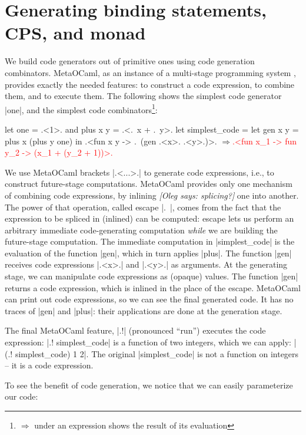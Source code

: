 \documentclass[draft]{elsart}
\newcommand{\evalresult}[1]{\ensuremath{\Longrightarrow}\textcolor{red}{#1}}
\newcommand{\oleg}[1]{{\it [Oleg says: #1]}}
\begin{document}
\section{Generating binding statements, CPS, and monad}\label{CPS}

We build code generators out of primitive ones using code generation 
combinators. MetaOCaml, as an instance of a multi-stage
programming system \cite{TahaThesis}, provides exactly the needed
features: to construct a code expression, to combine them, and to
execute them. The following shows the simplest code generator |one|,
and the simplest code combinators\footnote{%
$\Longrightarrow$ under an expression shows the result of its evaluation}:

\begin{code}
let one = .<1>. and plus x y = .<.~x + .~y>.
let simplest_code = let gen x y = plus x (plus y one) in
  .<fun x y -> .~(gen .<x>. .<y>.)>.
\evalresult{.<fun x_1 -> fun y_2 -> (x_1 + (y_2 + 1))>.}
\end{code}

We use MetaOCaml brackets |.<...>.| to generate code expressions,
i.e., to construct future-stage computations. MetaOCaml provides only
one mechanism of combining code expressions, by inlining
\oleg{splicing?} one into
another. The power of that operation, called escape |.~|, comes from
the fact that the expression to be spliced in (inlined) can be
computed: escape lets us perform an arbitrary immediate code-generating
computation \emph{while} we are
building the future-stage computation. The immediate computation in
|simplest_code| is the evaluation of the function |gen|, which in turn
applies |plus|. The function |gen| receives code expressions |.<x>.|
and |.<y>.| as arguments. At the generating stage, we can manipulate
code expressions as (opaque) values. The function |gen| returns a code
expression, which is inlined in the place of the escape. MetaOCaml can
print out code expressions, so we can see the final generated code. It
has no traces of |gen| and |plus|: their applications are done at the
generation stage.

The final MetaOCaml feature, |.!| (pronounced ``run'') 
executes the code expression: |.! simplest_code| is a function of two
integers, which we can apply: |(.! simplest_code) 1 2|. The original
|simplest_code| is not a function on integers -- it is a code
expression.

To see the benefit of code generation, we notice that we can easily
parameterize our code:
\end{document}
